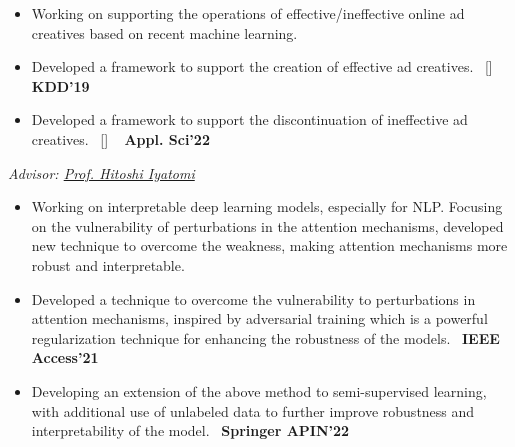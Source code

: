 \begin{projects}
{\begin{itemize}
			\item Working on supporting the operations of effective/ineffective online ad creatives based on recent machine learning.
			\item Developed a framework to support the creation of effective ad creatives.~ [\href{https://github.com/shunk031/Multi-task-Conditional-Attention-Networks}{\small{\githubSymbol}}] ~ {\small{\lbrack\textbf{{KDD'19}}\rbrack}}
			\item Developed a framework to support the discontinuation of ineffective ad creatives.~ [\href{https://www.mdpi.com/2076-3417/12/7/3594}{\small{\websiteSymbol}}] ~ {\small{\lbrack\textbf{{Appl. Sci'22}}\rbrack}}
		\end{itemize}
	}
	{
		\textit{Advisor:  \href{https://iyatomi-lab.info/english/people/2013-6-8}{Prof. Hitoshi Iyatomi}}
	}
	{
		\begin{itemize}
			\setlength\itemsep{0.3em}
			\item Working on interpretable deep learning models, especially for NLP. Focusing on the vulnerability of perturbations in the attention mechanisms, developed new technique to overcome the weakness, making attention mechanisms more robust and interpretable.
			\item Developed a technique to overcome the vulnerability to perturbations in attention mechanisms, inspired by adversarial training which is a powerful regularization technique for enhancing the robustness of the models.~ {\small{\lbrack\textbf{{IEEE Access'21}}\rbrack}}
			\item Developing an extension of the above method to semi-supervised learning, with additional use of unlabeled data to further improve robustness and interpretability of the model.~ {\small{\lbrack\textbf{{Springer APIN'22}}\rbrack}}
		\end{itemize}
	}

\end{projects}
